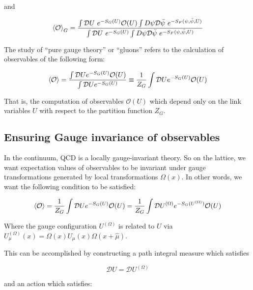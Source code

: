 \documentclass[11pt]{article}
\begin{document}
and

\begin{equation}\braket{\mathcal O}_G=\frac{\int\mathcal DU\ e^{-S_G(U)}\mathcal O(U)\int D\psi\mathcal D\bar\psi\ e^{-S_F(\psi,\bar\psi,U)}}{\int\mathcal DU\mathcal\ e^{-S_G(U)}\int D\psi\mathcal D\bar\psi\ e^{-S_F(\psi,\bar\psi,U)}}\end{equation}

The study of ``pure gauge theory'' or ``gluons'' refers to the calculation of observables of the following form:

\begin{equation}\label{eq:gauge_observable}\braket{\mathcal O}=\frac{\int \mathcal DU e^{-S_G(U)}\mathcal O(U)}{\int \mathcal DU e^{-S_G(U)}}\equiv\frac{1}{Z_G}\int \mathcal DU e^{-S_G(U)}\mathcal O(U)\end{equation}

That is, the computation of observables $\mathcal O(U)$ which depend only on the link variables $U$ with respect to the partition function $Z_G$.



\subsection{Ensuring Gauge invariance of observables}

In the continuum, QCD is a locally gauge-invariant theory. So on the lattice, we want expectation values of observables to be invariant under gauge transformations generated by local transformations $\Omega(x)$. In other words, we want the following condition to be satisfied:

\begin{equation}\braket{\mathcal O}=\frac{1}{Z_G}\int \mathcal DU e^{-S_G(U)}\mathcal O(U)=\frac{1}{Z_G}\int \mathcal DU^{(\Omega)} e^{-S_G(U^{(\Omega)})}\mathcal O(U)\end{equation}

Where the gauge configuration $U^{(\Omega)}$ is related to $U$ via $U^{(\Omega)}_\mu(x)=\Omega(x)U_\mu(x)\Omega(x+\hat\mu)$. 

This can be accomplished by constructing a path integral measure which satisfies

\begin{equation}\label{eq:gauge_invariant_path_integral_measure}\mathcal DU=\mathcal DU^{(\Omega)}\end{equation}

and an action which satisfies:
\end{document}
